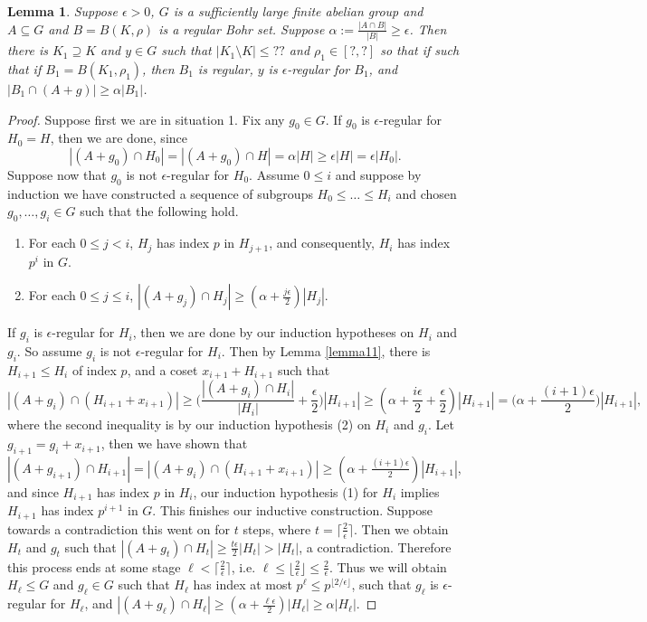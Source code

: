 \documentclass[11pt]{article}
\newtheorem{lemma}{Lemma}
\theoremstyle{definition}
\begin{document}
\begin{lemma}\label{incrementlem}
Suppose $\epsilon>0$, $G$ is a sufficiently large finite abelian group and $A\subseteq G$ and $B=B(K,\rho)$ is a regular Bohr set.  Suppose $\alpha:= \frac{|A\cap B|}{|B|}\geq \epsilon$.  Then there is $K_1\supseteq K$ and $y\in G$ such that $|K_1\setminus K|\leq ??$ and $\rho_1\in [?,?]$ so that if such that if $B_1=B(K_1,\rho_1)$, then $B_1$ is regular, $y$ is $\epsilon$-regular for $B_1$, and $|B_1\cap (A+g)|\geq \alpha |B_1|$.
\end{lemma}
\begin{proof}
Suppose first we are in situation 1. Fix any $g_0\in G$.  If $g_0$ is $\epsilon$-regular for $H_0=H$, then we are done, since 
$$
|(A+g_0)\cap H_0|=|(A+g_0)\cap H|=\alpha |H|\geq \epsilon |H|=\epsilon |H_0|.
$$
Suppose now that $g_0$ is not $\epsilon$-regular for $H_0$.  Assume $0\leq i$ and suppose by induction we have constructed a sequence of subgroups $H_0\leq \ldots \leq H_i$ and chosen $g_0,\ldots, g_i\in G$ such that the following hold.
\begin{enumerate}
\item For each $0\leq j<i$, $H_j$ has index $p$ in $H_{j+1}$, and consequently, $H_i$ has index $p^i$ in $G$.
\item For each $0\leq j\leq i$, $|(A+g_j)\cap H_j|\geq (\alpha+\frac{j\epsilon}{2})|H_j|$.
\end{enumerate}
If $g_i$ is $\epsilon$-regular for $H_i$, then we are done by our induction hypotheses on $H_i$ and $g_i$.  So assume $g_i$ is not $\epsilon$-regular for $H_i$.  Then by Lemma \ref{lemma11}, there is $H_{i+1}\leq H_i$ of index $p$, and a coset $x_{i+1}+H_{i+1}$ such that
$$
|(A+g_i)\cap (H_{i+1}+x_{i+1})|\geq \Big(\frac{|(A+g_i)\cap H_i|}{|H_i|}+\frac{\epsilon}{2}\Big)|H_{i+1}| \geq (\alpha+\frac{i\epsilon}{2}+\frac{\epsilon}{2})|H_{i+1}|=\Big(\alpha+\frac{(i+1)\epsilon}{2}\Big)|H_{i+1}|,
$$
where the second inequality is by our induction hypothesis (2) on $H_i$ and $g_i$.  Let $g_{i+1}=g_i+x_{i+1}$, then we have shown that $|(A+g_{i+1})\cap H_{i+1}|=|(A+g_i)\cap (H_{i+1}+x_{i+1})|\geq (\alpha+ \frac{(i+1)\epsilon}{2})|H_{i+1}|$, and since $H_{i+1}$ has index $p$ in $H_i$, our induction hypothesis (1) for $H_i$ implies $H_{i+1}$ has index $p^{i+1}$ in $G$. This finishes our inductive construction.  Suppose towards a contradiction this went on for $t$ steps, where $t=\lceil \frac{2}{\epsilon}\rceil$.  Then we obtain $H_t$ and $g_t$ such that $|(A+g_t)\cap H_t|\geq \frac{t\epsilon}{2} |H_t|>|H_t|$, a contradiction.  Therefore this process ends at some stage $\ell<\lceil \frac{2}{\epsilon}\rceil$, i.e. $\ell\leq \lfloor \frac{2}{\epsilon}\rfloor\leq \frac{2}{\epsilon}$.  Thus we will obtain $H_{\ell}\leq G$ and $g_{\ell}\in G$ such that $H_{\ell}$ has index at most $p^{\ell}\leq p^{\lfloor 2/\epsilon\rfloor}$, such that $g_{\ell}$ is $\epsilon$-regular for $H_{\ell}$, and $|(A+g_{\ell})\cap H_{\ell}|\geq (\alpha+\frac{\ell \epsilon}{2}) |H_{\ell}|\geq \alpha|H_{\ell}|$.
\end{proof}
\end{document}
